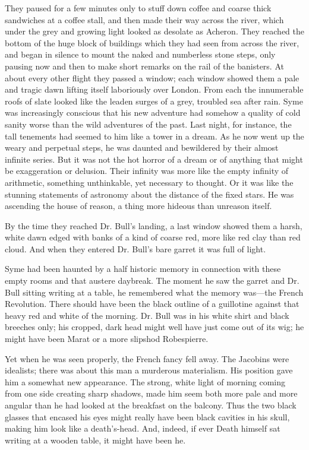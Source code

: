 They paused for a few minutes only to stuff down coffee and coarse thick sandwiches at a coffee stall, and then made their way across the river, which under the grey and growing light looked as desolate as Acheron. They reached the bottom of the huge block of buildings which they had seen from across the river, and began in silence to mount the naked and numberless stone steps, only pausing now and then to make short remarks on the rail of the banisters. At about every other flight they passed a window; each window showed them a pale and tragic dawn lifting itself laboriously over London. From each the innumerable roofs of slate looked like the leaden surges of a grey, troubled sea after rain. Syme was increasingly conscious that his new adventure had somehow a quality of cold sanity worse than the wild adventures of the past. Last night, for instance, the tall tenements had seemed to him like a tower in a dream. As he now went up the weary and perpetual steps, he was daunted and bewildered by their almost infinite series. But it was not the hot horror of a dream or of anything that might be exaggeration or delusion. Their infinity was more like the empty infinity of arithmetic, something unthinkable, yet necessary to thought. Or it was like the stunning statements of astronomy about the distance of the fixed stars. He was ascending the house of reason, a thing more hideous than unreason itself.

By the time they reached Dr. Bull’s landing, a last window showed them a harsh, white dawn edged with banks of a kind of coarse red, more like red clay than red cloud. And when they entered Dr. Bull’s bare garret it was full of light.

Syme had been haunted by a half historic memory in connection with these empty rooms and that austere daybreak. The moment he saw the garret and Dr. Bull sitting writing at a table, he remembered what the memory was⁠—the French Revolution. There should have been the black outline of a guillotine against that heavy red and white of the morning. Dr. Bull was in his white shirt and black breeches only; his cropped, dark head might well have just come out of its wig; he might have been Marat or a more slipshod Robespierre.

Yet when he was seen properly, the French fancy fell away. The Jacobins were idealists; there was about this man a murderous materialism. His position gave him a somewhat new appearance. The strong, white light of morning coming from one side creating sharp shadows, made him seem both more pale and more angular than he had looked at the breakfast on the balcony. Thus the two black glasses that encased his eyes might really have been black cavities in his skull, making him look like a death’s-head. And, indeed, if ever Death himself sat writing at a wooden table, it might have been he.

